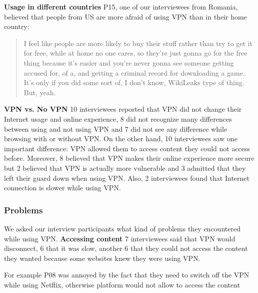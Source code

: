 \textbf{Usage in different countries}
P15, one of our interviewees from Romania, believed that people from US are more afraid of using VPN than in their home country:
\begin{quote}I feel like people are more likely to buy their stuff rather than try to get it for free, while at home no one cares, so they're just gonna go for the free thing because it's easier and you're never gonna see someone getting accused for, of a, and getting a criminal record for downloading a game. It's only if you did some sort of, I don't know, WikiLeaks type of thing. But, yeah.\end{quote}

\textbf{VPN vs. No VPN}
10 interviewees reported that VPN did not change their Internet usage and online experience, 8 did not recognize many differences between using and not using VPN and 7 did not see any difference while browsing with or without VPN. On the other hand, 10 interviewees saw one important difference: VPN allowed them to access content they could not access before. Moreover, 8 believed that VPN makes their online experience more secure but 2 believed that VPN is actually more vulnerable and 3 admitted that they left their guard down when using VPN. Also, 2 interviewees found that Internet connection is slower while using VPN.

\subsubsection{Problems}
We asked our interview participants what kind of problems they encountered while using VPN. 
\textbf{Accessing content} 7 interviewees said that VPN would disconnect, 6 that it was slow, another 6 that they could not access the content they wanted because some websites knew they were using VPN. 


For example P08 was annoyed by the fact that they need to switch off the VPN while using Netflix, otherwise platform would not allow to access the content

